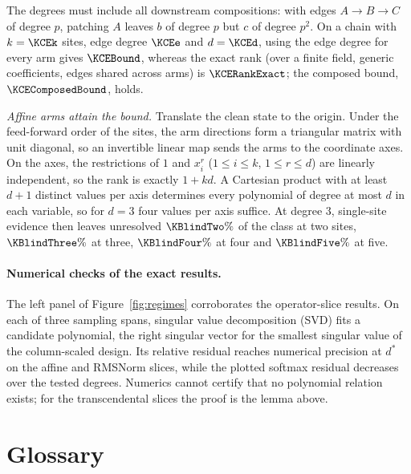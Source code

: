 The degrees must include all downstream compositions: with edges $A\to B\to C$ of degree $p$, patching $A$ leaves $b$ of degree
$p$ but $c$ of degree $p^2$. On a chain with $k=\KCEk$ sites, edge degree $\KCEe$ and $d=\KCEd$, using the edge degree
for every arm gives $\KCEBound$, whereas the exact rank (over a finite field, generic coefficients, edges shared across
arms) is $\KCERankExact$; the composed bound, $\KCEComposedBound$, holds.

\emph{Affine arms attain the bound.} Translate the clean state to the origin. Under the feed-forward order of
the sites, the arm directions form a triangular matrix with unit diagonal, so an invertible linear map sends the
arms to the coordinate axes. On the axes, the restrictions of $1$ and $x_i^r$ ($1\le i\le k$, $1\le r\le d$) are
linearly independent, so the rank is exactly $1+kd$. A Cartesian product with at least $d+1$ distinct values per axis
determines every polynomial of degree at most $d$ in each variable, so for $d=3$ four values per axis suffice. At degree $3$, single-site evidence then leaves unresolved $\KBlindTwo\%$ of the
class at two sites, $\KBlindThree\%$ at three, $\KBlindFour\%$ at four and $\KBlindFive\%$ at five.

\paragraph{Numerical checks of the exact results.} The left panel of Figure~\ref{fig:regimes} corroborates the
operator-slice results. On each of three sampling spans, singular value decomposition (SVD) fits a candidate
polynomial, the right singular vector for the smallest singular value of the column-scaled design. Its relative
residual reaches numerical precision at $d^*$ on the affine and RMSNorm slices, while the plotted softmax residual
decreases over the tested degrees. Numerics cannot certify that no polynomial relation exists; for the
transcendental slices the proof is the lemma above.

\section{Glossary}
\label{app:glossary}

